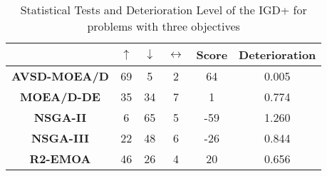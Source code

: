 \begin{table}[t]
\caption{Statistical Tests and Deterioration Level of the IGD+ for problems with three objectives}
\label{tab:Tests_IGDP_2obj}
\centering
\begin{scriptsize}
\begin{tabular}{c|c|c|c|c|c|}
\cline{2-6}
\textbf{} & \textbf{$\uparrow$} & \textbf{$\downarrow$} & \textbf{$\leftrightarrow$} & \textbf{Score} & \textbf{Deterioration} \\ \hline
\multicolumn{1}{|c|}{\textbf{AVSD-MOEA/D}} & 69 & 5 & 2 & 64 & 0.005 \\ \hline
\multicolumn{1}{|c|}{\textbf{MOEA/D-DE}} & 35 & 34 & 7 & 1 & 0.774 \\ \hline
\multicolumn{1}{|c|}{\textbf{NSGA-II}} & 6 & 65 & 5 & -59 & 1.260 \\ \hline
\multicolumn{1}{|c|}{\textbf{NSGA-III}} & 22 & 48 & 6 & -26 & 0.844 \\ \hline
\multicolumn{1}{|c|}{\textbf{R2-EMOA}} & 46 & 26 & 4 & 20 & 0.656 \\ \hline
\end{tabular}%
\end{scriptsize}
\end{table}





